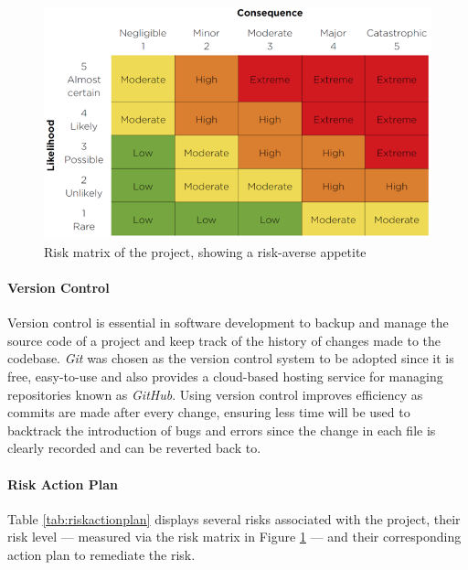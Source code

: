 \documentclass[12pt, a4paper]{article}
\begin{document}
\begin{figure}[H]
    \centering
    \includegraphics[scale=0.87]{images/riskmatrix.png}
    \caption{Risk matrix of the project, showing a risk-averse appetite}
    \label{fig:riskmatrix}
\end{figure}

\paragraph{Version Control}

Version control is essential in software development to backup and manage the source code of a project and keep track of the history of changes made to the codebase. \textit{Git} was chosen as the version control system to be adopted since it is free, easy-to-use and also provides a cloud-based hosting service for managing repositories known as \textit{GitHub}. Using version control improves efficiency as commits are made after every change, ensuring less time will be used to backtrack the introduction of bugs and errors since the change in each file is clearly recorded and can be reverted back to. 

\paragraph{Risk Action Plan}

Table \ref{tab:riskactionplan} displays several risks associated with the project, their risk level --- measured via the risk matrix in Figure \ref{fig:riskmatrix} --- and their corresponding action plan to remediate the risk.
\end{document}
